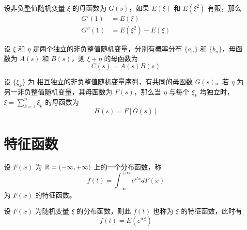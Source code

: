 \documentclass[12pt,a4paper]{amsart}
\begin{document}
\begin{proposition}
    设非负整值随机变量 $\xi$ 的母函数为 $G(s)$，如果 $E(\xi)$ 和 $E(\xi^2)$ 有限，那么
    \begin{equation}
        \begin{aligned}
            G'(1) &= E(\xi) \\
            G''(1) &= E(\xi^2) - E(\xi)
        \end{aligned}
    \end{equation}
\end{proposition}

\begin{proposition}[独立和的母函数]
    设 $\xi$ 和 $\eta$ 是两个独立的非负整值随机变量，分别有概率分布 $\{a_n\}$ 和 $\{b_n\}$，母函数为 $A(s)$ 和 $B(s)$，则 $\xi + \eta$ 的母函数为
    \begin{equation}
        C(s) = A(s)B(s)
    \end{equation}
\end{proposition}

\begin{proposition}[随机多个非负整值随机变量之和的母函数]
    设 $\{\xi_k\}$ 为 相互独立的非负整值随机变量序列，有共同的母函数 $G(s)$。若 $\eta$ 为另一非负整值随机变量，其母函数为 $F(s)$，那么当 $\eta$ 与每个 $\xi_k$ 均独立时，$\xi = \sum_{k=1}^\eta \xi_k$ 的母函数为
    \begin{equation}
        H(s) = F[G(s)]
    \end{equation}
\end{proposition}

\section{特征函数}

\begin{definition}[特征函数]
    设 $F(x)$ 为 $\mathbb{R} = (-\infty, +\infty)$ 上的一个分布函数，称
    \begin{equation}
        f(t) = \int_{-\infty}^{+\infty} e^{itx} dF(x)
    \end{equation}
    为 $F(x)$ 的特征函数。
\end{definition}

\begin{definition}[随机变量的特征函数]
    设 $F(x)$ 为随机变量 $\xi$ 的分布函数，则此 $f(t)$ 也称为 $\xi$ 的特征函数，此时有
    \begin{equation}\label{eq:特征函数的期望}
        f(t) = E(e^{it\xi})
    \end{equation}
\end{definition}
\end{document}
